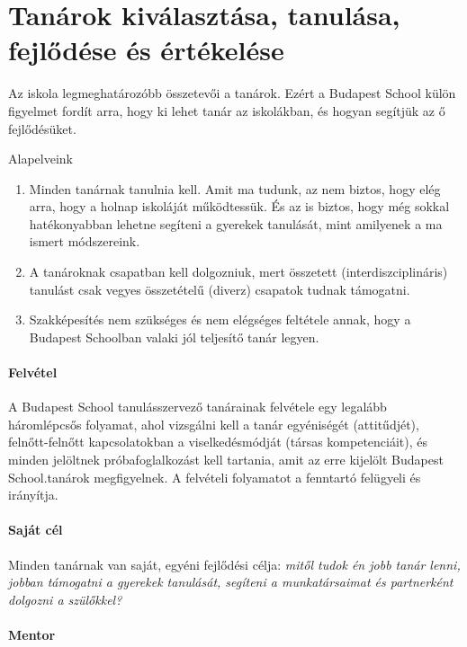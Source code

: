 \section{Tanárok kiválasztása, tanulása, fejlődése és értékelése}

Az iskola legmeghatározóbb összetevői a tanárok.
Ezért a Budapest School külön figyelmet fordít arra, hogy ki lehet tanár az
iskolákban, és hogyan segítjük az ő fejlődésüket.

Alapelveink
\begin{enumerate}
  \item Minden tanárnak tanulnia kell. Amit ma tudunk, az nem biztos, hogy elég
        arra, hogy a holnap iskoláját működtessük. És az is biztos, hogy még sokkal
        hatékonyabban lehetne segíteni a gyerekek tanulását, mint amilyenek a ma ismert
        módszereink.

  \item A tanároknak csapatban kell dolgozniuk, mert összetett
        (interdiszciplináris) tanulást csak vegyes összetételű (diverz) csapatok tudnak
        támogatni.

  \item Szakképesítés nem szükséges és nem elégséges feltétele annak, hogy a
        Budapest Schoolban valaki jól teljesítő tanár legyen.
\end{enumerate}

\paragraph{Felvétel}
A Budapest School tanulásszervező tanárainak felvétele egy legalább háromlépcsős
folyamat, ahol vizsgálni kell a tanár egyéniségét (attitűdjét), felnőtt-felnőtt
kapcsolatokban a viselkedésmódját (társas kompetenciáit), és minden jelöltnek
próbafoglalkozást kell tartania, amit az erre kijelölt Budapest School.tanárok
megfigyelnek. A felvételi folyamatot a fenntartó felügyeli és irányítja.

\paragraph{Saját cél}

Minden tanárnak van saját, egyéni fejlődési célja: \emph{mitől tudok én jobb
  tanár lenni, jobban támogatni a gyerekek tanulását, segíteni a munkatársaimat
  és partnerként dolgozni a szülőkkel?}

\paragraph{Mentor}

